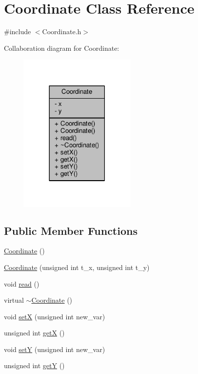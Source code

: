 \hypertarget{class_coordinate}{}\section{Coordinate Class Reference}
\label{class_coordinate}


{\ttfamily \#include $<$Coordinate.\+h$>$}



Collaboration diagram for Coordinate\+:
\nopagebreak
\begin{figure}[H]
\begin{center}
\leavevmode
\includegraphics[width=165pt]{class_coordinate__coll__graph}
\end{center}
\end{figure}
\subsection*{Public Member Functions}
\begin{DoxyCompactItemize}
\item 
\hyperlink{class_coordinate_aac6f323a685fc1e88fbea9c86f1e600d}{Coordinate} ()
\item 
\hyperlink{class_coordinate_a8851ee18948f8b6433b0afc6b59095a7}{Coordinate} (unsigned int t\+\_\+x, unsigned int t\+\_\+y)
\item 
void \hyperlink{class_coordinate_a7a332d39b84136f15e8d3565b3c235f0}{read} ()
\item 
virtual \hyperlink{class_coordinate_ac57d6eb147832a234cc5deaff8c94346}{$\sim$\+Coordinate} ()
\item 
void \hyperlink{class_coordinate_a330c37af7bb87f30a55173617112eade}{setX} (unsigned int new\+\_\+var)
\item 
unsigned int \hyperlink{class_coordinate_a590d96a9210bc7c63854c88f8641dce8}{getX} ()
\item 
void \hyperlink{class_coordinate_ad4b804672ac33f50024d66f3bb46e033}{setY} (unsigned int new\+\_\+var)
\item 
unsigned int \hyperlink{class_coordinate_aafb7d8a5075196ba89e2cb8d70405a1c}{getY} ()
\end{DoxyCompactItemize}
